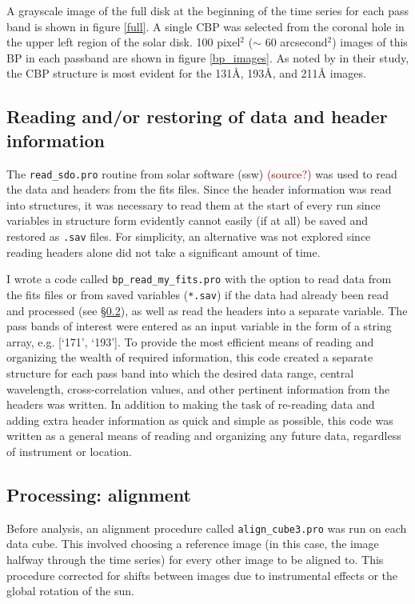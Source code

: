 \documentclass[preprint]{aastex}   %
\begin{document}
A grayscale image of the full disk at the beginning of the time series for each
pass band is shown in figure \ref{full}.
A single CBP was selected from the coronal hole in the upper
left region of the solar disk.
100 pixel$^{2}$ ($\sim$ 60 arcsecond$^{2}$)
images of this BP in each passband are shown in figure \ref{bp_images}.
As noted by \cite{Alipour} in their study, the CBP structure is most evident for the
131\AA{}, 193\AA{}, and 211\AA{} images.


\subsection{Reading and/or restoring of data and header information}
The \verb|read_sdo.pro| routine from solar software (ssw)
\textcolor{darkred}{(source?)} was used to read the data and headers from the
fits files.
Since the header information was read into structures, it was necessary to
read them at the start of every run since
variables in structure form evidently cannot
easily (if at all) be saved and restored as \verb|.sav| files.
For simplicity, an alternative was not explored since reading headers
alone did not take a significant amount of time.

I wrote a code called \verb|bp_read_my_fits.pro| with the option to read
data from the fits files or from saved variables (\verb|*.sav|) if the data had
already been read and processed (see \S\ref{ssec:align}), as well as read
the headers into a separate variable.
The pass bands of interest were entered as an input variable in the form of
a string array, e.g. [`171', `193'].
To provide the most efficient means of reading and organizing the wealth of
required information, this code created
a separate structure for each pass band
into which the desired data range, central wavelength,
cross-correlation values, and other pertinent information from the headers was written.
In addition to making the task of re-reading data and adding extra header information
as quick and simple as possible, this code was written as a general means of
reading and organizing any future data, regardless of instrument or location.


\subsection{Processing: alignment}\label{ssec:align}
Before analysis, an alignment procedure called \verb|align_cube3.pro|
was run on each data cube. This
involved choosing a reference image (in this case, the image halfway through
the time series) for every other image to be aligned to. This procedure
corrected for shifts between images due to instrumental effects or the global
rotation of the sun.
\end{document}
